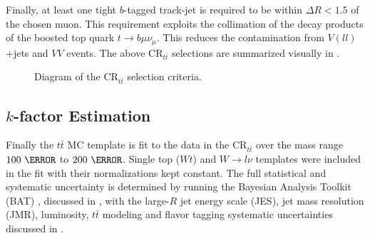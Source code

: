 Finally, at least one tight $b$-tagged track-jet is required to be within
$\Delta R < 1.5$ of the chosen muon.  This requirement exploits the collimation
of the decay products of the boosted top quark $t \rightarrow
b\mu\nu_{\mu}$.  This reduces the contamination from $V(ll)$+jets
and $VV$ events. The above $\text{CR}_{t\bar{t}}$ selections are summarized visually in .

\begin{figure}[!htbp]
\centering
\caption{Diagram of the $\text{CR}_{t\bar{t}}$ selection criteria.}
\label{sec:background:ttbar_selection_diagram}
\end{figure}

\subsection{$k$-factor Estimation}

Finally the $t\bar{t}$ MC template is fit to the data in the
$\text{CR}_{t\bar{t}}$ over the mass range $100~\GeV$ to $200~\GeV$.  Single
top ($Wt$) and $W \rightarrow l\nu$ templates were included in the fit with
their normalizations kept constant. The full statistical and systematic
uncertainty is determined by running the Bayesian Analysis Toolkit (BAT)
\cite{Beaujean:2011zz}, discussed in , with the large-$R$ jet
energy scale (JES), jet mass resolution (JMR), luminosity, $t\bar{t}$
modeling and flavor tagging systematic uncertainties discussed in
.

